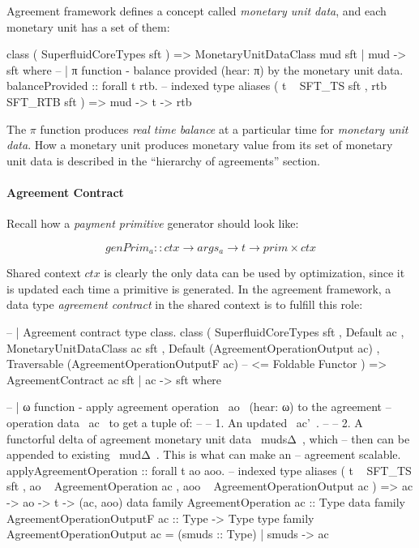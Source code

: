 Agreement framework defines a concept called \textit{monetary unit data}, and each monetary unit has
a set of them:

\begin{code}
class ( SuperfluidCoreTypes sft
      ) => MonetaryUnitDataClass mud sft | mud -> sft where
    -- | π function - balance provided (hear: π) by the monetary unit data.
    balanceProvided
        :: forall t rtb.
           -- indexed type aliases
           ( t ~ SFT_TS sft
           , rtb ~ SFT_RTB sft
           )
        => mud -> t -> rtb
\end{code}

The $\pi$ function produces \textit{real time balance} at a particular time for \textit{monetary
unit data}. How a monetary unit produces monetary value from its set of monetary unit data is
described in the ``hierarchy of agreements'' section.

\paragraph{Agreement Contract}

Recall how a \textit{payment primitive} generator should look like:

\begin{equation}
    genPrim_a :: ctx \rightarrow args_a \rightarrow t \rightarrow prim \times ctx
\end{equation}

Shared context $ctx$ is clearly the only data can be used by optimization, since it is updated each
time a primitive is generated. In the agreement framework, a data type \textit{agreement contract}
in the shared context is to fulfill this role:

\begin{code}
-- | Agreement contract type class.
class ( SuperfluidCoreTypes sft
      , Default ac
      , MonetaryUnitDataClass ac sft
      , Default (AgreementOperationOutput ac)
      , Traversable (AgreementOperationOutputF ac) -- <= Foldable Functor
      ) => AgreementContract ac sft | ac -> sft where

    -- | ω function - apply agreement operation ~ao~ (hear: ω) to the agreement
    --                operation data ~ac~ to get a tuple of:
    --
    --   1. An updated ~ac'~.
    --
    --   2. A functorful delta of agreement monetary unit data ~mudsΔ~, which
    --      then can be appended to existing ~mudΔ~.  This is what can make an
    --      agreement scalable.
    applyAgreementOperation
        :: forall t ao aoo.
           -- indexed type aliases
           ( t ~ SFT_TS sft
           , ao ~ AgreementOperation ac
           , aoo ~ AgreementOperationOutput ac
           )
        => ac -> ao -> t -> (ac, aoo)
    data family AgreementOperation ac :: Type
    data family AgreementOperationOutputF ac :: Type -> Type
    type family AgreementOperationOutput ac = (smuds :: Type) | smuds -> ac
\end{code}

